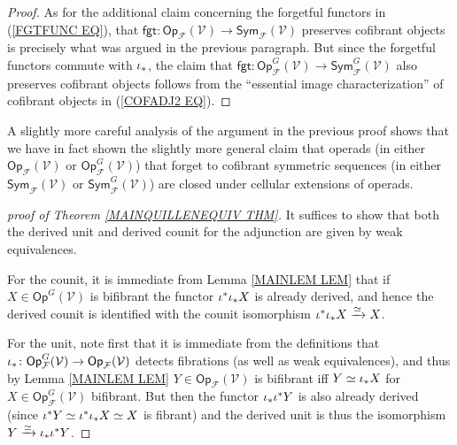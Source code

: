 \documentclass[a4paper,10pt]{article}%
\begin{document}
\begin{proof}
As for the additional claim concerning the forgetful functors
in (\ref{FGTFUNC EQ}),
that $\mathsf{fgt} \colon
\mathsf{Op}_{\mathcal{F}}(\mathcal{V})
\to \mathsf{Sym}_{\mathcal{F}}(\mathcal{V})$
preserves cofibrant objects is precisely what was argued in the previous paragraph.
But since the forgetful functors commute with $\iota_{\**}$, the claim that
$\mathsf{fgt} \colon
\mathsf{Op}^G_{\mathcal{F}}(\mathcal{V})
\to \mathsf{Sym}^G_{\mathcal{F}}(\mathcal{V})$
also preserves cofibrant objects follows from the
``essential image characterization'' of cofibrant objects in
(\ref{COFADJ2 EQ}).
\end{proof}


\begin{remark}
	A slightly more careful analysis of the argument in the previous proof shows that we have in fact shown the slightly more general claim that operads 
(in either 
$\mathsf{Op}_{\mathcal{F}}(\mathcal{V})$ or
$\mathsf{Op}_{\mathcal{F}}^G(\mathcal{V})$)
that forget to cofibrant symmetric sequences
(in either 
$\mathsf{Sym}_{\mathcal{F}}(\mathcal{V})$ or
$\mathsf{Sym}_{\mathcal{F}}^G(\mathcal{V})$)
are closed under cellular extensions of operads. 
\end{remark}



\begin{proof}[proof of Theorem \ref{MAINQUILLENEQUIV THM}]
It suffices to show that both the derived unit and derived counit for the adjunction are given by weak equivalences.

For the counit, it is immediate from Lemma \ref{MAINLEM LEM} that if $X \in \mathsf{Op}^G(\mathcal{V})$ is bifibrant
the functor $\iota^{\**} \iota_{\**} X$ is already derived, and hence the derived counit is identified with the counit isomorphism $\iota^{\**} \iota_{\**} X \xrightarrow{\simeq} X$.

For the unit, note first that it is immediate from the definitions that 
$\iota_{\**} \colon 
\mathsf{Op}^{G}_{\mathcal{F}}(\mathcal{V})\to 
\mathsf{Op}_{\mathcal{F}}(\mathcal{V})$
detects fibrations (as well as weak equivalences), 
and thus by Lemma \ref{MAINLEM LEM}
$Y \in \mathsf{Op}_{\mathcal{F}}(\mathcal{V})$
is bifibrant iff $Y \simeq \iota_{\**} X$
for $X \in \mathsf{Op}^{G}_{\mathcal{F}}(\mathcal{V})$ bifibrant.
But then the functor $\iota_{\**} \iota^{\**} Y$ 
is also already derived (since $\iota^{\**} Y \simeq \iota^{\**}\iota_{\**} X \simeq X$ is fibrant) and the derived unit is thus the isomorphism
$Y \xrightarrow{\simeq} \iota_{\**} \iota^{\**} Y$.
\end{proof}
\end{document}
